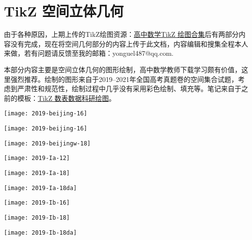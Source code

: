 \documentclass[
extrafontsizes,
 twoside,
 11pt,
 openright,
 final,
 ]{memoir}
\begin{document}
\ifnum {}
\renewcommand\chapterillustration{chapter-1}
\else
\renewcommand\chapterillustration{abertura-funcoes-professor}
\fi
\renewcommand\chapterwhat{由于各种原因，上期上传的TikZ绘图资源：\href{https://www.latexstudio.net/index/details/index/mid/2025.html}{高中数学TikZ 绘图合集}后有两部分内容没有完成，现在将空间几何部分的内容上传于此文档，内容编辑和搜集全程本人来做，若有问题请反馈至我的邮箱：yonguel487@qq.com.}
\renewcommand\chapterbecause{本部分内容主要是空间立体几何的图形绘制，高中数学教师下载学习颇有价值，这里强烈推荐。绘制的图形来自于2019--2021年全国高考真题卷的空间集合试题，考虑到严肃性和规范性，绘制过程中几乎没有采用彩色绘制、填充等。笔记来自于之前的模板：\href{https://www.latexstudio.net/index/details/index/mid/1083.html}{TikZ 数表数据科研绘图}。}
\chapter{{\boxtitlefont TikZ} 空间立体几何}
\label{chap-1}

\mbox{}\thispagestyle{empty}

\thispagestyle{empty}
\def\funcoeschap{}

\mainmatter


\indent 由于各种原因，上期上传的TikZ绘图资源：\href{https://www.latexstudio.net/index/details/index/mid/2025.html}{高中数学TikZ 绘图合集}后有两部分内容没有完成，现在将空间几何部分的内容上传于此文档，内容编辑和搜集全程本人来做，若有问题请反馈至我的邮箱：yonguel487@qq.com.

\indent 本部分内容主要是空间立体几何的图形绘制，高中数学教师下载学习颇有价值，这里强烈推荐。绘制的图形来自于2019--2021年全国高考真题卷的空间集合试题，考虑到严肃性和规范性，绘制过程中几乎没有采用彩色绘制、填充等。笔记来自于之前的模板：\href{https://www.latexstudio.net/index/details/index/mid/1083.html}{TikZ 数表数据科研绘图}。



\begin{minipage}{0.4\linewidth}
  \texttt{[image: 2019-beijing-16]}
\end{minipage}\hfill
\begin{minipage}{0.56\linewidth}
  
\end{minipage}\hfill

\texttt{[image: 2019-beijing-16]}

\texttt{[image: 2019-beijingw-18]}

\texttt{[image: 2019-Ia-12]}

\texttt{[image: 2019-Ia-18]}

\texttt{[image: 2019-Ia-18da]}

\texttt{[image: 2019-Ib-16]}

\texttt{[image: 2019-Ib-18]}

\texttt{[image: 2019-Ib-18da]}





\end{document}
